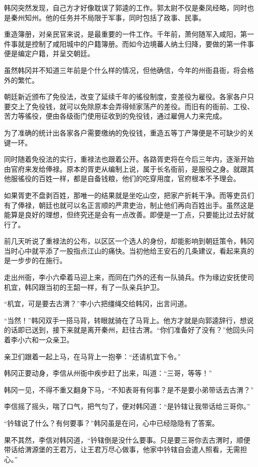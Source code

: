 韩冈突然发现，自己方才好像耽误了郭逵的工作。郭太尉不仅是秦凤经略，同时也是秦州知州。他的任务并不局限于军事，同时包括了政事、民事。

重造簿册，对亲民官来说，是最重要的一件工作。千年前，萧何随军入咸阳，第一件事就是控制了咸阳城中的户籍簿册。而如今边境蕃人纳土归降，要做的第一件事便是编定户籍，并呈交朝廷。

虽然韩冈并不知道三年前是个什么样的情况，但他确信，今年的州衙县衙，将会格外的繁忙。

朝廷新近颁布了免役法，改变了延续千年的徭役制度，变差役为雇役。各家各户只要交上了免役钱，就可以免除原本会弄得倾家荡产的差役。而旧有的衙前、工役、苦力等徭役，便由各级衙门使用征收到的免役钱，通过雇佣人力来完成。

为了准确的统计出各家各户需要缴纳的免役钱，重造五等丁产簿便是不可缺少的关键一环。

同时随着免役法的实行，重禄法也跟着公开。各路胥吏将在今后三年内，逐渐开始由官府来发给俸禄。原本的胥吏从编制上说，属于长名衙前，是服役之身。就跟其他服徭役的百姓一样，都是自备钱粮，他们的吃穿用度，官府根本不予理会。

如果胥吏不盘剥百姓，那唯一的结果就是坐吃山空，把家产折耗干净。而等吏员们有了俸禄，朝廷也就可以名正言顺的严肃吏治，制止他们再向百姓出手。虽然这是能算是良好的理想，但终究还是会有一点改善。即便是一丁点，只要能比过去好就行了。

前几天听说了重禄法的公布，以区区一个选人的身份，却能影响到朝廷策令，韩冈当时心中就平添了一股指点江山的痛快。当初他给王安石的几条建议，看起来真的是一步步的在施行。

走出州衙，李小六牵着马迎上来，而同在门外的还有一队骑兵。作为缘边安抚使司机宜，韩冈跟当初的王韶一样，有了一队亲兵护卫。

“机宜，可是要去古渭？”李小六把缰绳交给韩冈，出言问道。

“当然！”韩冈双手一搭马背，转眼就骑在了马背上。他方才就是向郭逵辞行，想说的话即已送到，接下来就是离开秦州，赶往古渭。“你们准备好了没有？”他回头问着李小六和一众亲卫。

亲卫们跟着一起上马，在马背上一抱拳：“还请机宜下令。”

韩冈正要动身，李信从州衙中疾步赶了出来，叫道：“三哥，等等！”

韩冈一见，不得不重又翻身下马，“不知表哥有何事？是不是要小弟带话去古渭？”

李信摇了摇头，喘了口气，把气匀了，便对韩冈道：“是钤辖让我带话给三哥你。”

“钤辖说了什么？有何要事？”韩冈虽是在问，心中已经隐隐有了答案。

果不其然，李信对韩冈道，“钤辖倒是没什么要事。只是要三哥你去古渭时，顺便带话给渭源堡的王君万，让王君万尽心做事，他家中钤辖自会遣人照看，无需担心。”

